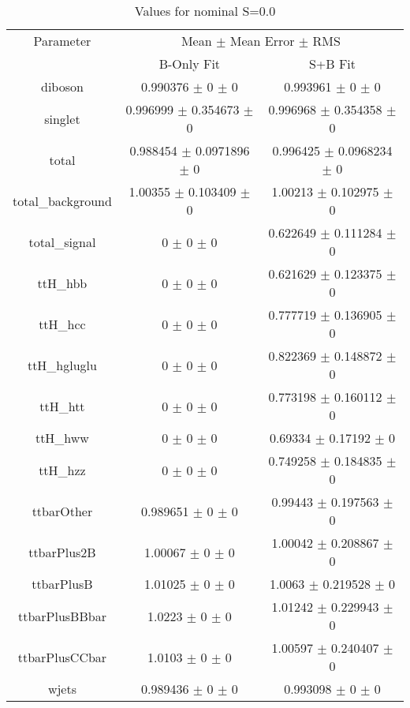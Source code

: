 \begin{table}
\centering
\caption{Values for nominal S=0.0}
\begin{tabular}{ccc}
\toprule
Parameter & \multicolumn{2}{c}{Mean $\pm$ Mean Error $\pm$ RMS}\\
 & B-Only Fit & S+B Fit\\
\midrule
diboson & \num{0.990376} $\pm$ \num{0} $\pm$ \num{0} & \num{0.993961} $\pm$ \num{0} $\pm$ \num{0}\\
singlet & \num{0.996999} $\pm$ \num{0.354673} $\pm$ \num{0} & \num{0.996968} $\pm$ \num{0.354358} $\pm$ \num{0}\\
total & \num{0.988454} $\pm$ \num{0.0971896} $\pm$ \num{0} & \num{0.996425} $\pm$ \num{0.0968234} $\pm$ \num{0}\\
total\_background & \num{1.00355} $\pm$ \num{0.103409} $\pm$ \num{0} & \num{1.00213} $\pm$ \num{0.102975} $\pm$ \num{0}\\
total\_signal & \num{0} $\pm$ \num{0} $\pm$ \num{0} & \num{0.622649} $\pm$ \num{0.111284} $\pm$ \num{0}\\
ttH\_hbb & \num{0} $\pm$ \num{0} $\pm$ \num{0} & \num{0.621629} $\pm$ \num{0.123375} $\pm$ \num{0}\\
ttH\_hcc & \num{0} $\pm$ \num{0} $\pm$ \num{0} & \num{0.777719} $\pm$ \num{0.136905} $\pm$ \num{0}\\
ttH\_hgluglu & \num{0} $\pm$ \num{0} $\pm$ \num{0} & \num{0.822369} $\pm$ \num{0.148872} $\pm$ \num{0}\\
ttH\_htt & \num{0} $\pm$ \num{0} $\pm$ \num{0} & \num{0.773198} $\pm$ \num{0.160112} $\pm$ \num{0}\\
ttH\_hww & \num{0} $\pm$ \num{0} $\pm$ \num{0} & \num{0.69334} $\pm$ \num{0.17192} $\pm$ \num{0}\\
ttH\_hzz & \num{0} $\pm$ \num{0} $\pm$ \num{0} & \num{0.749258} $\pm$ \num{0.184835} $\pm$ \num{0}\\
ttbarOther & \num{0.989651} $\pm$ \num{0} $\pm$ \num{0} & \num{0.99443} $\pm$ \num{0.197563} $\pm$ \num{0}\\
ttbarPlus2B & \num{1.00067} $\pm$ \num{0} $\pm$ \num{0} & \num{1.00042} $\pm$ \num{0.208867} $\pm$ \num{0}\\
ttbarPlusB & \num{1.01025} $\pm$ \num{0} $\pm$ \num{0} & \num{1.0063} $\pm$ \num{0.219528} $\pm$ \num{0}\\
ttbarPlusBBbar & \num{1.0223} $\pm$ \num{0} $\pm$ \num{0} & \num{1.01242} $\pm$ \num{0.229943} $\pm$ \num{0}\\
ttbarPlusCCbar & \num{1.0103} $\pm$ \num{0} $\pm$ \num{0} & \num{1.00597} $\pm$ \num{0.240407} $\pm$ \num{0}\\
wjets & \num{0.989436} $\pm$ \num{0} $\pm$ \num{0} & \num{0.993098} $\pm$ \num{0} $\pm$ \num{0}\\
\bottomrule
\end{tabular}
\end{table}